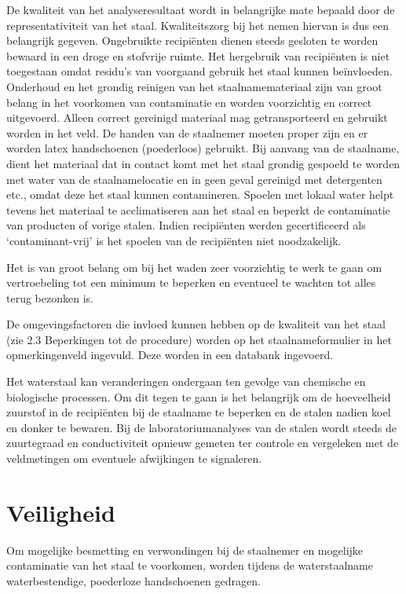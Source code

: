 \documentclass[
]{scrreprt}
\begin{document}
De kwaliteit van het analyseresultaat wordt in belangrijke mate bepaald door de representativiteit van het staal. Kwaliteitszorg bij het nemen hiervan is dus een belangrijk gegeven. Ongebruikte recipiënten dienen steeds gesloten te worden bewaard in een droge en stofvrije ruimte. Het hergebruik van recipiënten is niet toegestaan omdat residu's van voorgaand gebruik het staal kunnen beïnvloeden. Onderhoud en het grondig reinigen van het staalnamemateriaal zijn van groot belang in het voorkomen van contaminatie en worden voorzichtig en correct uitgevoerd. Alleen correct gereinigd materiaal mag getransporteerd en gebruikt worden in het veld. De handen van de staalnemer moeten proper zijn en er worden latex handschoenen (poederloos) gebruikt. Bij aanvang van de staalname, dient het materiaal dat in contact komt met het staal grondig gespoeld te worden met water van de staalnamelocatie en in geen geval gereinigd met detergenten etc., omdat deze het staal kunnen contamineren. Spoelen met lokaal water helpt tevens het materiaal te acclimatiseren aan het staal en beperkt de contaminatie van producten of vorige stalen. Indien recipiënten werden gecertificeerd als `contaminant-vrij' is het spoelen van de recipiënten niet noodzakelijk.

Het is van groot belang om bij het waden zeer voorzichtig te werk te gaan om vertroebeling tot een minimum te beperken en eventueel te wachten tot alles terug bezonken is.

De omgevingsfactoren die invloed kunnen hebben op de kwaliteit van het staal (zie 2.3 Beperkingen tot de procedure) worden op het staalnameformulier in het opmerkingenveld ingevuld. Deze worden in een databank ingevoerd.

Het waterstaal kan veranderingen ondergaan ten gevolge van chemische en biologische processen. Om dit tegen te gaan is het belangrijk om de hoeveelheid zuurstof in de recipiënten bij de staalname te beperken en de stalen nadien koel en donker te bewaren. Bij de laboratoriumanalyses van de stalen wordt steeds de zuurtegraad en conductiviteit opnieuw gemeten ter controle en vergeleken met de veldmetingen om eventuele afwijkingen te signaleren.

\chapter{Veiligheid}\label{veiligheid}

Om mogelijke besmetting en verwondingen bij de staalnemer en mogelijke contaminatie van het staal te voorkomen, worden tijdens de waterstaalname waterbestendige, poederloze handschoenen gedragen.
\end{document}
